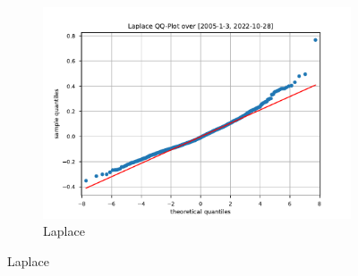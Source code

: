 \begin{figure}[htbp]
\begin{subfigure}[b]{0.32\textwidth}
        \includegraphics[width=\textwidth]{content/reschap4/Figures/laplace_QQ_2005-1-3-2022-10-28.pdf}
        \caption{Laplace}
    \end{subfigure}


\end{figure}
